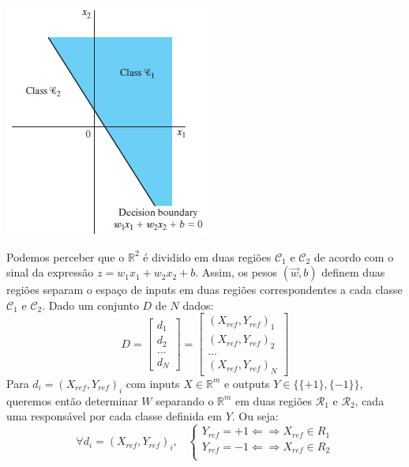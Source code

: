 \documentclass[
	12pt,				%
	oneside,			%
	a4paper,			%
	english,			%
	french,				%
	spanish,			%
	brazil,				%
	]{abntex2}
\begin{document}
\begin{center}
	\includegraphics[scale=1]{perceptron2d.png}
\end{center} 

Podemos perceber que o $\mathbb{R}^2$ é dividido em duas regiões $\mathcal{C}_1$ e $\mathcal{C}_2$ de acordo com o sinal da expressão $z = w_1x_1 + w_2x_2 + b$. Assim, os pesos $(\vec{w},b)$ definem duas regiões   separam o espa\c{c}o de inputs em duas regi\~oes correspondentes a cada classe $\mathcal{C}_1$ e $\mathcal{C}_2$. Dado um conjunto $D$ de $N$ dados:
$$D = \begin{bmatrix}
d_1 \\
d_2 \\
... \\
d_N
\end{bmatrix} =
\begin{bmatrix}
(X_{ref},Y_{ref})_1 \\
(X_{ref},Y_{ref})_2 \\
... \\
(X_{ref},Y_{ref})_N
\end{bmatrix}$$
Para $d_i = (X_{ref},Y_{ref})_i$ com inputs $X \in \mathbb{R}^m$ e outputs $Y \in \{\{+1\},\{-1\}\}$, queremos então determinar $W$ separando o $\mathbb{R}^m$ em duas regiões $\mathcal{R}_1$ e $\mathcal{R}_2$, cada uma responsável por cada classe definida em $Y$. Ou seja:
$$\forall d_i = (X_{ref},Y_{ref})_i \text{,}  \enspace \enspace \begin{cases}
Y_{ref} = +1 \Leftarrow \Rightarrow X_{ref} \in R_1 \\
Y_{ref} = -1 \Leftarrow \Rightarrow X_{ref} \in R_2 \\
\end{cases} $$
\end{document}

